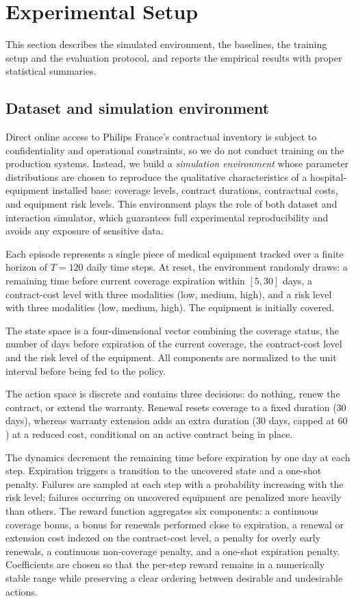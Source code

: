 \section{Experimental Setup}
\label{sec:experiments}

This section describes the simulated environment, the baselines, the
training setup and the evaluation protocol, and reports the empirical
results with proper statistical summaries.


\subsection{Dataset and simulation environment}
\label{subsec:dataset}

Direct online access to Philips France's contractual inventory is subject
to confidentiality and operational constraints, so we do not conduct
training on the production systems. Instead, we build a \emph{simulation
environment} whose parameter distributions are chosen to reproduce the
qualitative characteristics of a hospital-equipment installed base:
coverage levels, contract durations, contractual costs, and equipment
risk levels. This environment plays the role of both dataset and
interaction simulator, which guarantees full experimental reproducibility
and avoids any exposure of sensitive data.

Each episode represents a single piece of medical equipment tracked over
a finite horizon of $T = 120$ daily time steps. At reset, the
environment randomly draws: a remaining time before current coverage
expiration within $[5, 30]$ days, a contract-cost level with three
modalities (low, medium, high), and a risk level with three modalities
(low, medium, high). The equipment is initially covered.

The state space is a four-dimensional vector combining the coverage
status, the number of days before expiration of the current coverage,
the contract-cost level and the risk level of the equipment. All
components are normalized to the unit interval before being fed to the
policy.

The action space is discrete and contains three decisions: do nothing,
renew the contract, or extend the warranty. Renewal resets coverage to a
fixed duration ($30$ days), whereas warranty extension adds an extra
duration ($30$ days, capped at $60$) at a reduced cost, conditional on
an active contract being in place.

The dynamics decrement the remaining time before expiration by one day
at each step. Expiration triggers a transition to the uncovered state
and a one-shot penalty. Failures are sampled at each step with a
probability increasing with the risk level; failures occurring on
uncovered equipment are penalized more heavily than others. The reward
function aggregates six components: a continuous coverage bonus, a bonus
for renewals performed close to expiration, a renewal or extension cost
indexed on the contract-cost level, a penalty for overly early renewals,
a continuous non-coverage penalty, and a one-shot expiration penalty.
Coefficients are chosen so that the per-step reward remains in a
numerically stable range while preserving a clear ordering between
desirable and undesirable actions.


